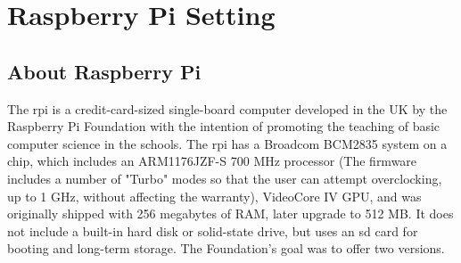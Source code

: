 \chapter{Raspberry Pi Setting}
\label{chp:rpi}

\section{About Raspberry Pi}
\par The \gls{rpi} is a credit-card-sized single-board computer developed in the UK by the Raspberry Pi Foundation with the intention of promoting the teaching of basic computer science in the schools. \cite{rpi} The \gls{rpi} has a Broadcom BCM2835 system on a chip, which includes an ARM1176JZF-S 700 MHz processor (The firmware includes a number of "Turbo" modes so that the user can attempt overclocking, up to 1 GHz, without affecting the warranty), VideoCore IV GPU, and was originally shipped with 256 megabytes of RAM, later upgrade to 512 MB. It does not include a built-in hard disk or solid-state drive, but uses an \gls{sd} card for booting and long-term storage. The Foundation's goal was to offer two versions.
